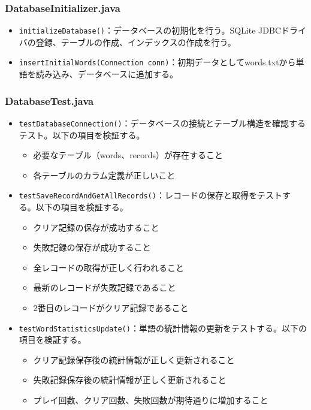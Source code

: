 \documentclass[a4j]{ujarticle}
\begin{document}
\subsubsection{DatabaseInitializer.java}
\begin{itemize}
  \item \texttt{initializeDatabase()}：データベースの初期化を行う。SQLite JDBCドライバの登録、テーブルの作成、インデックスの作成を行う。
  \item \texttt{insertInitialWords(Connection conn)}：初期データとしてwords.txtから単語を読み込み、データベースに追加する。
\end{itemize}

\subsubsection{DatabaseTest.java}
\begin{itemize}
  \item \texttt{testDatabaseConnection()}：データベースの接続とテーブル構造を確認するテスト。以下の項目を検証する。
  \begin{itemize}
    \item 必要なテーブル（words、records）が存在すること
    \item 各テーブルのカラム定義が正しいこと
  \end{itemize}
  \item \texttt{testSaveRecordAndGetAllRecords()}：レコードの保存と取得をテストする。以下の項目を検証する。
  \begin{itemize}
    \item クリア記録の保存が成功すること
    \item 失敗記録の保存が成功すること
    \item 全レコードの取得が正しく行われること
    \item 最新のレコードが失敗記録であること
    \item 2番目のレコードがクリア記録であること
  \end{itemize}
  \item \texttt{testWordStatisticsUpdate()}：単語の統計情報の更新をテストする。以下の項目を検証する。
  \begin{itemize}
    \item クリア記録保存後の統計情報が正しく更新されること
    \item 失敗記録保存後の統計情報が正しく更新されること
    \item プレイ回数、クリア回数、失敗回数が期待通りに増加すること
  \end{itemize}
\end{itemize}
\end{document}
